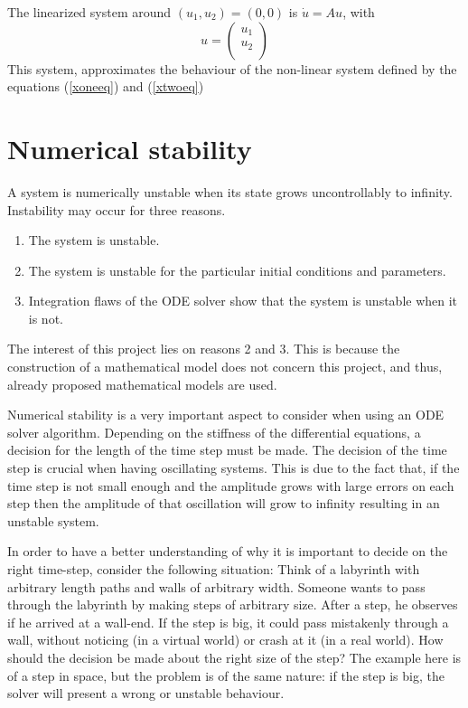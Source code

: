 The linearized system around $ (u_1, u_2)=(0,0) $ is $ \dot{u} = Au $, with 
$$ u = \begin{pmatrix}
u_1 \\
u_2 \\
\end{pmatrix} $$
This system, approximates the behaviour of the non-linear system defined by the equations (\ref{xoneeq}) and (\ref{xtwoeq})

\section{Numerical stability}	
    A system is numerically unstable when its state grows uncontrollably to infinity. 
Instability  may occur for three reasons.
    \begin{enumerate}
    \item The system is unstable.
    \item The system is unstable for the particular initial conditions and parameters.
    \item Integration flaws of the ODE solver show that the system is unstable when it is not.
    \end{enumerate}
    
The interest of this project lies on reasons 2 and 3. This is because the construction of a mathematical model does not concern this project, and thus, already proposed mathematical models are used.

Numerical stability is a very important aspect to consider when using an ODE solver algorithm. Depending on the stiffness of the differential equations, a decision for the length of the time step must be made. The decision of the time step is crucial when having oscillating systems. This is due to the fact that, if the time step is not small enough and the amplitude grows with large errors on each step then the amplitude of that oscillation will grow to infinity resulting in an unstable system.

In order to have a better understanding of why it is important to decide on the right time-step, consider the following situation: Think of a labyrinth with arbitrary length paths and walls of arbitrary width. Someone wants to pass through the labyrinth by making steps of arbitrary size. After a step, he observes if he arrived at a wall-end. If the step is big, it could pass mistakenly through a wall, without noticing (in a virtual world) or crash at it (in a real world). How should the decision be made about the right size of the step?
The example here is of a step in space, but the problem is of the same nature: if the step is big, the solver will present a wrong or unstable behaviour.

